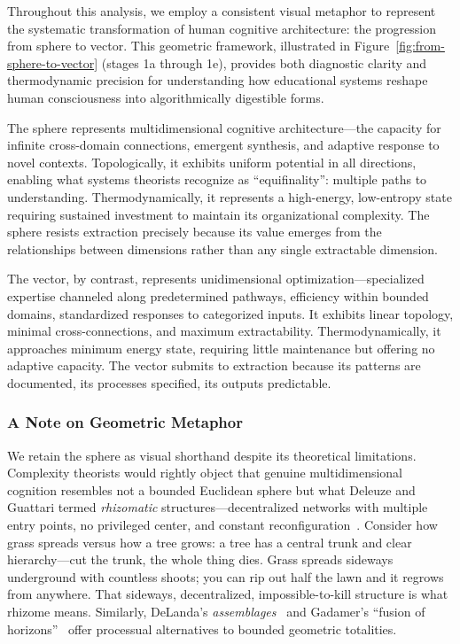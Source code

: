 Throughout this analysis, we employ a consistent visual metaphor to represent the systematic transformation of human cognitive architecture: the progression from sphere to vector. This geometric framework, illustrated in Figure~\ref{fig:from-sphere-to-vector} (stages 1a through 1e), provides both diagnostic clarity and thermodynamic precision for understanding how educational systems reshape human consciousness into algorithmically digestible forms.

The sphere represents multidimensional cognitive architecture---the capacity for infinite cross-domain connections, emergent synthesis, and adaptive response to novel contexts. Topologically, it exhibits uniform potential in all directions, enabling what systems theorists recognize as ``equifinality'': multiple paths to understanding. Thermodynamically, it represents a high-energy, low-entropy state requiring sustained investment to maintain its organizational complexity. The sphere resists extraction precisely because its value emerges from the relationships between dimensions rather than any single extractable dimension.

The vector, by contrast, represents unidimensional optimization---specialized expertise channeled along predetermined pathways, efficiency within bounded domains, standardized responses to categorized inputs. It exhibits linear topology, minimal cross-connections, and maximum extractability. Thermodynamically, it approaches minimum energy state, requiring little maintenance but offering no adaptive capacity. The vector submits to extraction because its patterns are documented, its processes specified, its outputs predictable.

\subsubsection{A Note on Geometric Metaphor}

We retain the sphere as visual shorthand despite its theoretical limitations. Complexity theorists would rightly object that genuine multidimensional cognition resembles not a bounded Euclidean sphere but what Deleuze and Guattari termed \textit{rhizomatic} structures---decentralized networks with multiple entry points, no privileged center, and constant reconfiguration~\citep{deleuze1987thousand}. Consider how grass spreads versus how a tree grows: a tree has a central trunk and clear hierarchy---cut the trunk, the whole thing dies. Grass spreads sideways underground with countless shoots; you can rip out half the lawn and it regrows from anywhere. That sideways, decentralized, impossible-to-kill structure is what rhizome means. Similarly, DeLanda's \textit{assemblages}~\citep{delanda2006new} and Gadamer's ``fusion of horizons''~\citep{gadamer1960truth} offer processual alternatives to bounded geometric totalities.

